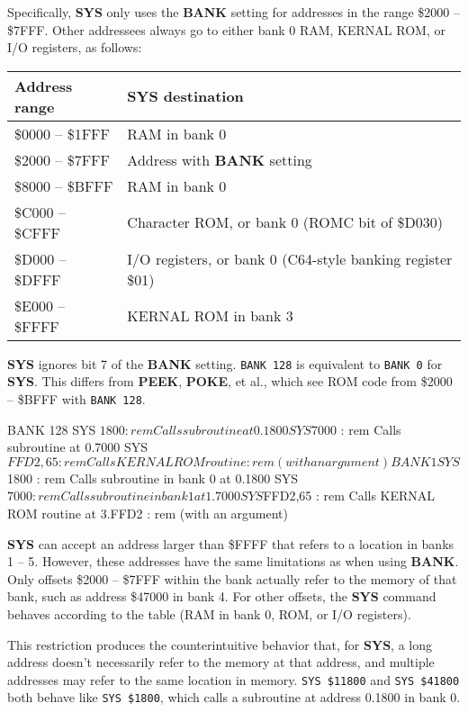 Specifically, {\bf SYS} only uses the {\bf BANK} setting for addresses in the range \$2000 -- \$7FFF. Other addressees always go to either bank 0 RAM, KERNAL ROM, or I/O registers, as follows:

\begin{tabular}{|l|l|}
\hline
{\bf Address range} & {\bf SYS destination} \\
\hline
\$0000 -- \$1FFF & RAM in bank 0 \\
\hline
\$2000 -- \$7FFF & Address with {\bf BANK} setting \\
\hline
\$8000 -- \$BFFF & RAM in bank 0 \\
\hline
\$C000 -- \$CFFF & Character ROM, or bank 0 (ROMC bit of \$D030) \\
\hline
\$D000 -- \$DFFF & I/O registers, or bank 0 (C64-style banking register \$01) \\
\hline
\$E000 -- \$FFFF & KERNAL ROM in bank 3 \\
\hline
\end{tabular}

{\bf SYS} ignores bit 7 of the {\bf BANK} setting. \texttt{BANK 128} is equivalent to \texttt{BANK 0} for {\bf SYS}. This differs from {\bf PEEK}, {\bf POKE}, et al., which see ROM code from \$2000 -- \$BFFF with \texttt{BANK 128}.

\begin{basiccode}
BANK 128
SYS $1800        : rem Calls subroutine at 0.1800
SYS $7000        : rem Calls subroutine at 0.7000
SYS $FFD2,65     : rem Calls KERNAL ROM routine
                 : rem (with an argument)

BANK 1
SYS $1800        : rem Calls subroutine in bank 0 at 0.1800
SYS $7000        : rem Calls subroutine in bank 1 at 1.7000
SYS $FFD2,65     : rem Calls KERNAL ROM routine at 3.FFD2
                 : rem (with an argument)
\end{basiccode}

{\bf SYS} can accept an address larger than \$FFFF that refers to a location in banks 1 -- 5. However, these addresses have the same limitations as when using {\bf BANK}. Only offsets \$2000 -- \$7FFF within the bank actually refer to the memory of that bank, such as address \$47000 in bank 4. For other offsets, the {\bf SYS} command behaves according to the table (RAM in bank 0, ROM, or I/O registers).

This restriction produces the counterintuitive behavior that, for {\bf SYS}, a long address doesn't necessarily refer to the memory at that address, and multiple addresses may refer to the same location in memory. \texttt{SYS \$11800} and \texttt{SYS \$41800} both behave like \texttt{SYS \$1800}, which calls a subroutine at address 0.1800 in bank 0.


